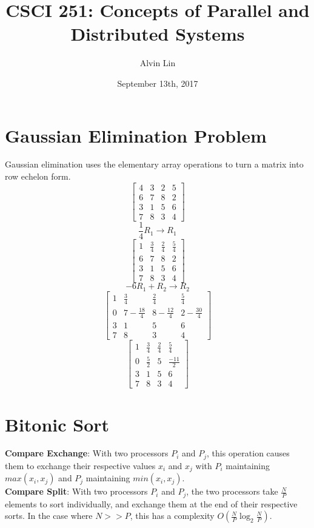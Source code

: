 \documentclass{math}
\title{CSCI 251: Concepts of Parallel and Distributed Systems}
\author{Alvin Lin}
\date{September 13th, 2017}
\begin{document}
\maketitle

\section*{Gaussian Elimination Problem}
Gaussian elimination uses the elementary array operations to turn a matrix
into row echelon form.
\[ \begin{bmatrix}
  4 & 3 & 2 & 5 \\
  6 & 7 & 8 & 2 \\
  3 & 1 & 5 & 6 \\
  7 & 8 & 3 & 4
\end{bmatrix} \]
\[ \frac{1}{4}R_1\to R_1 \]
\[ \begin{bmatrix}
  1 & \frac{3}{4} & \frac{2}{4} & \frac{5}{4} \\
  6 & 7 & 8 & 2 \\
  3 & 1 & 5 & 6 \\
  7 & 8 & 3 & 4
\end{bmatrix} \]
\[ -6R_1+R_2\to R_2 \]
\[ \begin{bmatrix}
  1 & \frac{3}{4} & \frac{2}{4} & \frac{5}{4} \\
  0 & 7-\frac{18}{4} & 8-\frac{12}{4} & 2-\frac{30}{4} \\
  3 & 1 & 5 & 6 \\
  7 & 8 & 3 & 4
\end{bmatrix} \]
\[ \begin{bmatrix}
  1 & \frac{3}{4} & \frac{2}{4} & \frac{5}{4} \\
  0 & \frac{5}{2} & 5 & \frac{-11}{2} \\
  3 & 1 & 5 & 6 \\
  7 & 8 & 3 & 4
\end{bmatrix} \]

\section*{Bitonic Sort}
\textbf{Compare Exchange}: With two processors \( P_i \) and \( P_j \), this
operation causes them to exchange their respective values \( x_i \) and
\( x_j \) with \( P_i \) maintaining \( max(x_i,x_j) \) and \( P_j \)
maintaining \( min(x_i,x_j) \). \\
\textbf{Compare Split}: With two processors \( P_i \) and \( P_j \), the
two processors take \( \frac{N}{P} \) elements to sort individually, and
exchange them at the end of their respective sorts. In the case where
\( N >> P \), this has a complexity \( O(\frac{N}{P}\log_2\frac{N}{P}) \).
\end{document}
